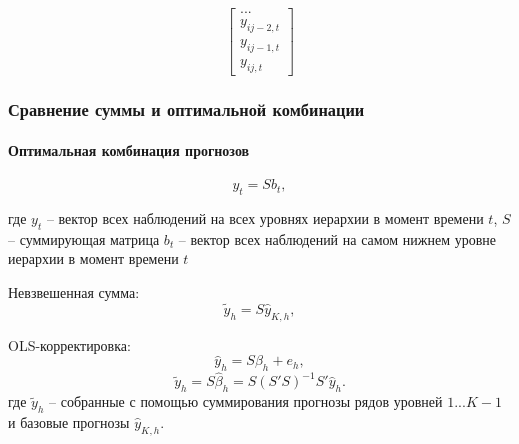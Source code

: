\documentclass[c, dvipsnames]{beamer}  %
\begin{document}
\begin{frame}[shrink=5]
\begin{equation}
\begin{bmatrix}
... \\
y_{ij-2, t} \\
y_{ij-1, t} \\
y_{ij, t}
\end{bmatrix}
\end{equation}

\end{frame}


\begin{frame}[shrink=5]
\frametitle{Сравнение суммы и оптимальной комбинации } 
\framesubtitle{Оптимальная комбинация прогнозов}


\begin{equation}\label{key}
y_t  = S b_t ,
\end{equation}

\noindent
где $y_t$ -- вектор всех наблюдений на всех уровнях иерархии в момент времени $t$, $S$  -- суммирующая матрица
$ b_t $ -- вектор всех наблюдений на самом нижнем уровне иерархии в момент времени $t$



	\begin{block}{Невзвешенная сумма:}
\begin{equation}\label{key}
\tilde{y}_h = S \hat{y}_{K,h}   ,
\end{equation}
\end{block}
\begin{block}{OLS-корректировка:}
\begin{equation}\label{abc}
\hat{y}_h = S \beta_h + e_h  ,
\end{equation}
\begin{equation}\label{key555}
\tilde{y}_h
= S \hat{\beta}_h  = S ( S'  S )^{-1}  S'    \hat{y}_h .
\end{equation}
где $\tilde{y}_h$  -- собранные с помощью суммирования прогнозы рядов уровней $1...K-1$  и базовые прогнозы $\hat{y}_{K,h}$. 


\end{block}


\end{frame}
\end{document}

